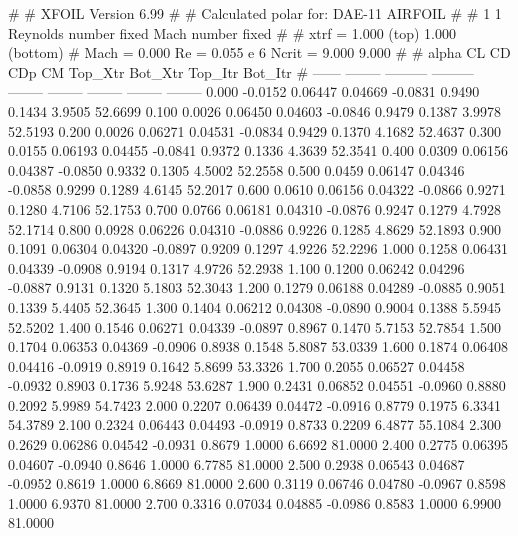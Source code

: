#  
#       XFOIL         Version 6.99
#  
# Calculated polar for: DAE-11 AIRFOIL                                  
#  
# 1 1 Reynolds number fixed          Mach number fixed         
#  
# xtrf =   1.000 (top)        1.000 (bottom)  
# Mach =   0.000     Re =     0.055 e 6     Ncrit =   9.000  9.000
#  
#   alpha    CL        CD       CDp       CM     Top_Xtr  Bot_Xtr  Top_Itr  Bot_Itr
#  ------ -------- --------- --------- -------- -------- -------- -------- --------
   0.000  -0.0152   0.06447   0.04669  -0.0831   0.9490   0.1434   3.9505  52.6699
   0.100   0.0026   0.06450   0.04603  -0.0846   0.9479   0.1387   3.9978  52.5193
   0.200   0.0026   0.06271   0.04531  -0.0834   0.9429   0.1370   4.1682  52.4637
   0.300   0.0155   0.06193   0.04455  -0.0841   0.9372   0.1336   4.3639  52.3541
   0.400   0.0309   0.06156   0.04387  -0.0850   0.9332   0.1305   4.5002  52.2558
   0.500   0.0459   0.06147   0.04346  -0.0858   0.9299   0.1289   4.6145  52.2017
   0.600   0.0610   0.06156   0.04322  -0.0866   0.9271   0.1280   4.7106  52.1753
   0.700   0.0766   0.06181   0.04310  -0.0876   0.9247   0.1279   4.7928  52.1714
   0.800   0.0928   0.06226   0.04310  -0.0886   0.9226   0.1285   4.8629  52.1893
   0.900   0.1091   0.06304   0.04320  -0.0897   0.9209   0.1297   4.9226  52.2296
   1.000   0.1258   0.06431   0.04339  -0.0908   0.9194   0.1317   4.9726  52.2938
   1.100   0.1200   0.06242   0.04296  -0.0887   0.9131   0.1320   5.1803  52.3043
   1.200   0.1279   0.06188   0.04289  -0.0885   0.9051   0.1339   5.4405  52.3645
   1.300   0.1404   0.06212   0.04308  -0.0890   0.9004   0.1388   5.5945  52.5202
   1.400   0.1546   0.06271   0.04339  -0.0897   0.8967   0.1470   5.7153  52.7854
   1.500   0.1704   0.06353   0.04369  -0.0906   0.8938   0.1548   5.8087  53.0339
   1.600   0.1874   0.06408   0.04416  -0.0919   0.8919   0.1642   5.8699  53.3326
   1.700   0.2055   0.06527   0.04458  -0.0932   0.8903   0.1736   5.9248  53.6287
   1.900   0.2431   0.06852   0.04551  -0.0960   0.8880   0.2092   5.9989  54.7423
   2.000   0.2207   0.06439   0.04472  -0.0916   0.8779   0.1975   6.3341  54.3789
   2.100   0.2324   0.06443   0.04493  -0.0919   0.8733   0.2209   6.4877  55.1084
   2.300   0.2629   0.06286   0.04542  -0.0931   0.8679   1.0000   6.6692  81.0000
   2.400   0.2775   0.06395   0.04607  -0.0940   0.8646   1.0000   6.7785  81.0000
   2.500   0.2938   0.06543   0.04687  -0.0952   0.8619   1.0000   6.8669  81.0000
   2.600   0.3119   0.06746   0.04780  -0.0967   0.8598   1.0000   6.9370  81.0000
   2.700   0.3316   0.07034   0.04885  -0.0986   0.8583   1.0000   6.9900  81.0000
